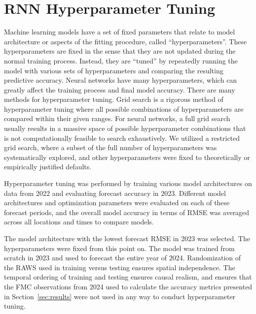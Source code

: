 \documentclass[fire,article,submit,pdftex,moreauthors]{Definitions/mdpi}
\begin{document}
\appendixstart
\appendix
\section[\appendixname~\thesection]{RNN Hyperparameter Tuning}
\label{sec:appendix_hyper}

Machine learning models have a set of fixed parameters that relate to model architecture or aspects of the fitting procedure, called ``hyperparameters''. These hyperparameters are fixed in the sense that they are not updated during the normal training process. Instead, they are ``tuned'' by repeatedly running the model with various sets of hyperparameters and comparing the resulting predictive accuracy. Neural networks have many hyperparameters, which can greatly affect the training process and final model accuracy. There are many methods for hyperparameter tuning. Grid search is a rigorous method of hyperparameter tuning where all possible combinations of hyperparameters are compared within their given ranges. For neural networks, a full grid search usually results in a massive space of possible hyperparameter combinations that is not computationally feasible to search exhaustively. We utilized a restricted grid search, where a subset of the full number of hyperparameters was systematically explored, and other hyperparameters were fixed to theoretically or empirically justified defaults. 

Hyperparameter tuning was performed by training various model architectures on data from 2022 and evaluating forecast accuracy in 2023. Different model architectures and optimization parameters were evaluated on each of these forecast periods, and the overall model accuracy in terms of RMSE was averaged across all locations and times to compare models. 

The model architecture with the lowest forecast RMSE in 2023 was selected. The hyperparameters were fixed from this point on. The model was trained from scratch in 2023 and used to forecast the entire year of 2024. Randomization of the RAWS used in training versus testing ensures spatial independence. The temporal ordering of training and testing ensures causal realism, and ensures that the FMC observations from 2024 used to calculate the accuracy metrics presented in Section~\ref{sec:results} were not used in any way to conduct hyperparameter tuning.
\end{document}
